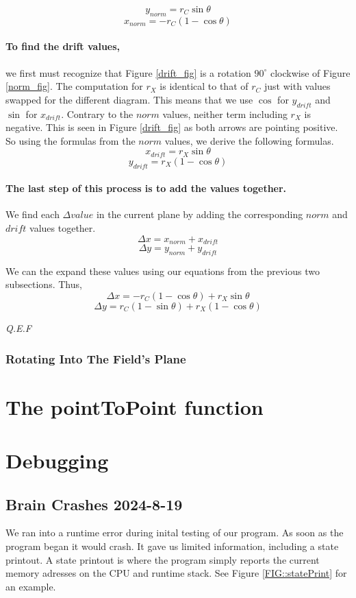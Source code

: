 \documentclass[12pt]{article}
\begin{document}
\centering
$$y_{norm} = r_C \sin\theta$$
$$x_{norm} = -r_C(1-\cos\theta)$$

\raggedright
\pagebreak

\paragraph{To find the drift values,} we first must recognize that Figure \ref{drift_fig} is a rotation $90^{\circ}$ clockwise of Figure \ref{norm_fig}. The computation for $r_X$ is identical to that of $r_C$ just with values swapped for the different diagram. This means that we use $\cos$ for $y_{drift}$ and $\sin$ for $x_{drift}$. Contrary to the $norm$ values, neither term including $r_X$ is negative. This is seen in Figure \ref{drift_fig} as both arrows are pointing positive. So using the formulas from the $norm$ values, we derive the following formulas.
$$ x_{drift} = r_X \sin\theta$$
$$ y_{drift} = r_X (1-\cos\theta)$$

\paragraph{The last step of this process is to add the values together.} We find each $\Delta value$ in the current plane by adding the corresponding $norm$ and $drift$ values together.
$$ \Delta x = x_{norm} + x_{drift} $$
$$ \Delta y = y_{norm} + y_{drift} $$

We can the expand these values using our equations from the previous two subsections. Thus,
$$ \Delta x =  -r_C (1-\cos\theta) + r_X \sin\theta $$
$$ \Delta y =  r_C (1-\sin\theta) + r_X (1-\cos\theta) $$

\textit{Q.E.F}
\subsubsection{Rotating Into The Field's Plane}

\section{The pointToPoint function}

\section{Debugging}

\subsection{Brain Crashes 2024-8-19}
We ran into a runtime error during inital testing of our program. As soon as the program began it would crash. It gave us limited information, including a state printout. A state printout is where the program simply reports the current memory adresses on the CPU and runtime stack. See Figure \ref{FIG::statePrint} for an example.
\end{document}

